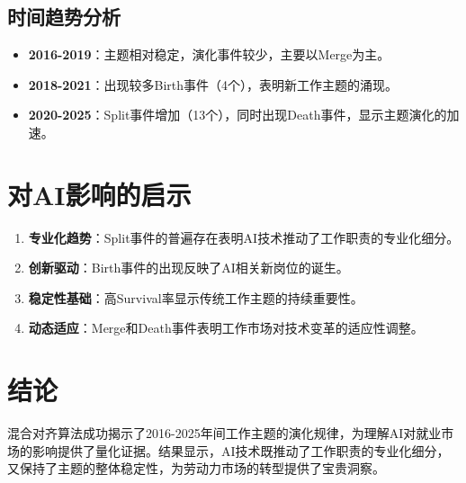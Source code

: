 \documentclass{article}
\begin{document}
\subsection{时间趋势分析}

\begin{itemize}
\item \textbf{2016-2019}：主题相对稳定，演化事件较少，主要以Merge为主。
\item \textbf{2018-2021}：出现较多Birth事件（4个），表明新工作主题的涌现。
\item \textbf{2020-2025}：Split事件增加（13个），同时出现Death事件，显示主题演化的加速。
\end{itemize}

\section{对AI影响的启示}

\begin{enumerate}
\item \textbf{专业化趋势}：Split事件的普遍存在表明AI技术推动了工作职责的专业化细分。
\item \textbf{创新驱动}：Birth事件的出现反映了AI相关新岗位的诞生。
\item \textbf{稳定性基础}：高Survival率显示传统工作主题的持续重要性。
\item \textbf{动态适应}：Merge和Death事件表明工作市场对技术变革的适应性调整。
\end{enumerate}

\section{结论}

混合对齐算法成功揭示了2016-2025年间工作主题的演化规律，为理解AI对就业市场的影响提供了量化证据。结果显示，AI技术既推动了工作职责的专业化细分，又保持了主题的整体稳定性，为劳动力市场的转型提供了宝贵洞察。
\end{document}
